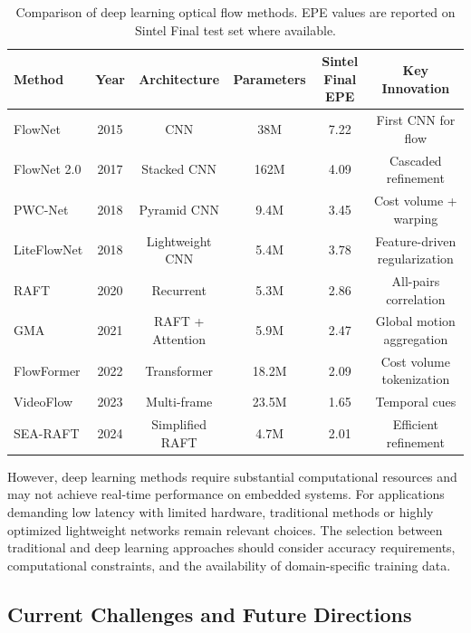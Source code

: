 \begin{table}[htbp]
\centering
\caption{Comparison of deep learning optical flow methods. EPE values are reported on Sintel Final test set where available.}
\label{tab:dl_comparison}
\begin{tabular}{lccccc}
\hline
\textbf{Method} & \textbf{Year} & \textbf{Architecture} & \textbf{Parameters} & \textbf{Sintel Final EPE} & \textbf{Key Innovation} \\
\hline
FlowNet \cite{dosovitskiy2015flownet} & 2015 & CNN & 38M & 7.22 & First CNN for flow \\
FlowNet 2.0 \cite{ilg2017flownet2} & 2017 & Stacked CNN & 162M & 4.09 & Cascaded refinement \\
PWC-Net \cite{sun2018pwcnet} & 2018 & Pyramid CNN & 9.4M & 3.45 & Cost volume + warping \\
LiteFlowNet \cite{hui2018liteflownet} & 2018 & Lightweight CNN & 5.4M & 3.78 & Feature-driven regularization \\
RAFT \cite{teed2020raft} & 2020 & Recurrent & 5.3M & 2.86 & All-pairs correlation \\
GMA \cite{jiang2021gma} & 2021 & RAFT + Attention & 5.9M & 2.47 & Global motion aggregation \\
FlowFormer \cite{huang2022flowformer} & 2022 & Transformer & 18.2M & 2.09 & Cost volume tokenization \\
VideoFlow \cite{shi2023videoflow} & 2023 & Multi-frame & 23.5M & 1.65 & Temporal cues \\
SEA-RAFT \cite{wang2024searaft} & 2024 & Simplified RAFT & 4.7M & 2.01 & Efficient refinement \\
\hline
\end{tabular}
\end{table}

However, deep learning methods require substantial computational resources and may not achieve real-time performance on embedded systems. For applications demanding low latency with limited hardware, traditional methods or highly optimized lightweight networks remain relevant choices. The selection between traditional and deep learning approaches should consider accuracy requirements, computational constraints, and the availability of domain-specific training data.

\subsection{Current Challenges and Future Directions}

